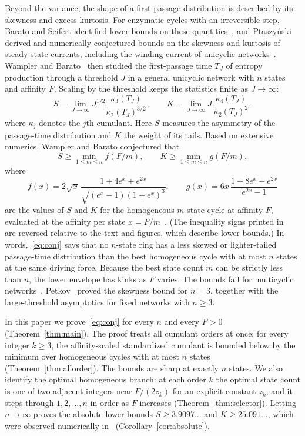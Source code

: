 \documentclass[11pt]{article}
\theoremstyle{remark}
\begin{document}
Beyond the variance, the shape of a first-passage distribution is described
by its skewness and excess kurtosis. For enzymatic cycles with an
irreversible step, Barato and Seifert identified lower bounds on these
quantities~\cite{bs}, and Ptaszy\'nski derived and numerically conjectured
bounds on the skewness and kurtosis of steady-state currents, including the
winding current of unicyclic networks~\cite{ptaszynski}. Wampler and
Barato~\cite{wb} then studied the
first-passage time $T_J$ of entropy production through a threshold $J$ in a
general unicyclic network with $n$ states and affinity $F$. Scaling by the
threshold keeps the statistics finite as $J\to\infty$:
\[
S=\lim_{J\to\infty}J^{1/2}\frac{\kappa_3(T_J)}{\kappa_2(T_J)^{3/2}},\qquad
K=\lim_{J\to\infty}J\,\frac{\kappa_4(T_J)}{\kappa_2(T_J)^{2}},
\]
where $\kappa_j$ denotes the $j$th cumulant. Here $S$ measures the asymmetry
of the passage-time distribution and $K$ the weight of its tails. Based on
extensive numerics, Wampler and Barato conjectured that
\begin{equation}\label{eq:conj}
S\ge\min_{1\le m\le n}f(F/m),\qquad K\ge\min_{1\le m\le n}g(F/m),
\end{equation}
where
\begin{equation}\label{eq:fg}
f(x)=2\sqrt{x}\,\frac{1+4e^x+e^{2x}}{\sqrt{(e^x-1)(1+e^x)^3}},\qquad
g(x)=6x\,\frac{1+8e^x+e^{2x}}{e^{2x}-1}
\end{equation}
are the values of $S$ and $K$ for the homogeneous $m$-state cycle at
affinity $F$, evaluated at the affinity per state
$x=F/m$~\cite[Eqs.~(19)--(22)]{wb}. (The inequality signs printed
in~\cite[Eqs.~(20)--(21)]{wb} are reversed relative to the text and figures,
which describe lower bounds.) In words,~\eqref{eq:conj} says that no
$n$-state ring has a less skewed or lighter-tailed passage-time distribution
than the best homogeneous cycle with at most $n$ states at the same driving
force. Because the best state count $m$ can be strictly less than $n$, the
lower envelope has kinks as $F$ varies. The bounds fail for multicyclic
networks~\cite{wb}. Petkov~\cite{petkov} proved the skewness bound for $n=3$,
together with the large-threshold asymptotics for fixed networks with
$n\ge3$.

In this paper we prove~\eqref{eq:conj} for every $n$ and every $F>0$
(Theorem~\ref{thm:main}). The proof treats all cumulant orders at once: for
every integer $k\ge3$, the affinity-scaled standardized cumulant is bounded
below by the minimum over homogeneous cycles with at most $n$ states
(Theorem~\ref{thm:allorder}). The bounds are sharp at exactly $n$ states. We
also identify the optimal homogeneous branch: at each order $k$ the optimal
state count is one of two adjacent integers near $F/(2z_k)$ for an explicit
constant $z_k$, and it steps through $1,2,\dots,n$ in order as $F$ increases
(Theorem~\ref{thm:selector}). Letting $n\to\infty$ proves the absolute
lower bounds $S\ge3.9097\ldots$ and $K\ge25.091\ldots$, which were
observed numerically in~\cite{wb} (Corollary~\ref{cor:absolute}).
\end{document}
